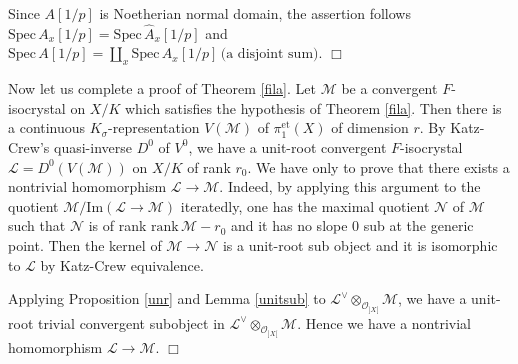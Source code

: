 \documentclass[11pt]{amsart}
\begin{document}
{ {Since $A[1/p]$ is Noetherian normal domain, 
the assertion follows $\mathrm{Spec}\, A_x[1/p] = \mathrm{Spec}\, \widehat{A}_x[1/p]$ 
and $\mathrm{Spec}\, A[1/p] = \coprod_x\mathrm{Spec}\,A_x[1/p]\, \mbox{(a disjoint sum)}$. 
} \hspace*{\fill} $\Box$}

\vspace*{3mm}

Now let us complete a proof of Theorem \ref{fila}. 
Let $\mathcal M$ be a convergent $F$-isocrystal on $X/K$ which satisfies the hypothesis of Theorem \ref{fila}. 
Then there is a continuous $K_\sigma$-representation $V(\mathcal M)$ of $\pi_1^{\mathrm{et}}(X)$ of dimension $r$. 
By Katz-Crew's quasi-inverse $D^0$ of $V^0$, 
we have a unit-root convergent $F$-isocrystal $\mathcal L = D^0(V(\mathcal M))$ 
on $X/K$ of rank $r_0$. We have only to prove that there exists a nontrivial homomorphism 
$\mathcal L \rightarrow \mathcal M$. Indeed, by applying this argument to the quotient 
$\mathcal M/\mathrm{Im}(\mathcal L \rightarrow \mathcal M)$ iteratedly, 
one has the maximal quotient $\mathcal N$ of $\mathcal M$ such that 
$\mathcal N$ is of rank $\mathrm{rank}\, \mathcal M - r_0$ 
and it has no slope $0$ sub at the generic point. Then the kernel of $\mathcal M \rightarrow \mathcal N$ 
is a unit-root sub object and it is isomorphic to $\mathcal L$ by Katz-Crew equivalence. 

Applying Proposition \ref{unr} and Lemma \ref{unitsub} to $\mathcal L^\vee \otimes_{\mathcal  O_{]X[}}\mathcal M$, 
we have a unit-root trivial convergent subobject in $\mathcal L^\vee \otimes_{\mathcal  O_{]X[}} \mathcal M$. 
Hence we have a nontrivial homomorphism $\mathcal L \rightarrow \mathcal M$. 
\hspace*{\fill} $\Box$

\vspace*{5mm}
\end{document}
